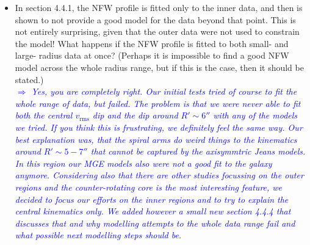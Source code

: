 \documentclass[10pt,a4paper]{article}
\newcommand{\Comment}[1]{\textsl{\textcolor{Blue}{$\Longrightarrow$ {#1}}}}
\begin{document}
\begin{itemize}
\item In section 4.4.1, the NFW profile is fitted only to the inner data, and then is
shown to not provide a good model for the data beyond that point. This is not
entirely surprising, given that the outer data were not used to constrain the model!
What happens if the NFW profile is fitted to both small- and large- radius data at
once? (Perhaps it is impossible to find a good NFW model across the whole radius
range, but if this is the case, then it should be stated.) \\\Comment{Yes, you are completely right. Our initial tests tried of course to fit the whole range of data, but failed. The problem is that we were never able to fit both the central $v_\text{rms}$ dip and the dip around $R'\sim 6''$ with any of the models we tried. If you think this is frustrating, we definitely feel the same way. Our best explanation was, that the spiral arms do weird things to the kinematics around $R'\sim 5-7''$ that cannot be captured by the axisymmtric Jeans models. In this region our MGE models also were not a good fit to the galaxy anymore. Considering also that there are other studies focussing on the outer regions and the counter-rotating core is the most interesting feature, we decided to focus our efforts on the inner regions and to try to explain the central kinematics only. We added however a small new section 4.4.4 that discusses that and why modelling attempts to the whole data range fail and what possible next modelling steps should be.}


\end{itemize}
\end{document}
